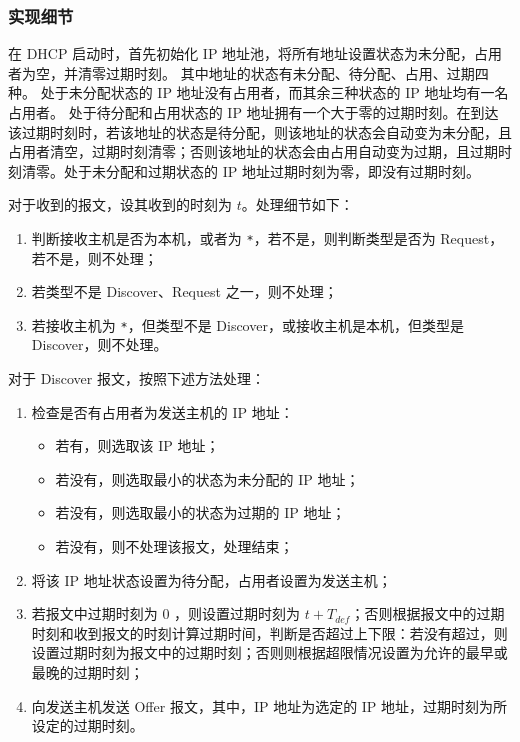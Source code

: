 \subsubsection*{实现细节}

在 DHCP 启动时，首先初始化 IP 地址池，将所有地址设置状态为未分配，占用者为空，并清零过期时刻。
其中地址的状态有未分配、待分配、占用、过期四种。
处于未分配状态的 IP 地址没有占用者，而其余三种状态的 IP 地址均有一名占用者。
处于待分配和占用状态的 IP 地址拥有一个大于零的过期时刻。在到达该过期时刻时，若该地址的状态是待分配，则该地址的状态会自动变为未分配，且占用者清空，过期时刻清零；否则该地址的状态会由占用自动变为过期，且过期时刻清零。处于未分配和过期状态的 IP 地址过期时刻为零，即没有过期时刻。

对于收到的报文，设其收到的时刻为 $t$。处理细节如下：

\begin{enumerate}

\item 判断接收主机是否为本机，或者为 \verb|*|，若不是，则判断类型是否为 Request，若不是，则不处理；

\item 若类型不是 Discover、Request 之一，则不处理；

\item 若接收主机为 \verb|*|，但类型不是 Discover，或接收主机是本机，但类型是 Discover，则不处理。

\end{enumerate}

对于 Discover 报文，按照下述方法处理：

\begin{enumerate}

\item 检查是否有占用者为发送主机的 IP 地址：\begin{itemize}

\item 若有，则选取该 IP 地址；

\item 若没有，则选取最小的状态为未分配的 IP 地址；

\item 若没有，则选取最小的状态为过期的 IP 地址；

\item 若没有，则不处理该报文，处理结束；

\end{itemize}



\item 将该 IP 地址状态设置为待分配，占用者设置为发送主机；

\item 若报文中过期时刻为 0 ，则设置过期时刻为 $t + T_{def}$；否则根据报文中的过期时刻和收到报文的时刻计算过期时间，判断是否超过上下限：若没有超过，则设置过期时刻为报文中的过期时刻；否则则根据超限情况设置为允许的最早或最晚的过期时刻；

\item 向发送主机发送 Offer 报文，其中，IP 地址为选定的 IP 地址，过期时刻为所设定的过期时刻。

\end{enumerate}

